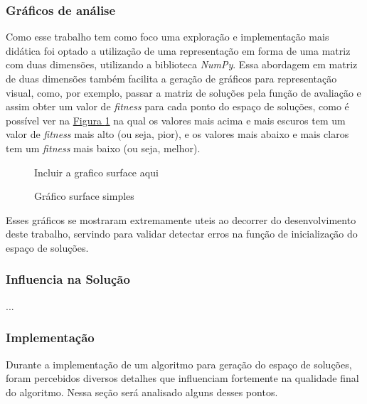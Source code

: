         \subsubsection{Gráficos de análise}
            Como esse trabalho tem como foco uma exploração e implementação mais didática foi optado a utilização de uma representação em forma de uma matriz com duas dimensões, utilizando a biblioteca \textit{NumPy}. Essa abordagem em matriz de duas dimensões também facilita a geração de gráficos para representação visual, como, por exemplo, passar a matriz de soluções pela função de avaliação e assim obter um valor de \textit{fitness} para cada ponto do espaço de soluções, como é possível ver na 
            \hyperref[fig:surfaceplot]{Figura \ref{fig:surfaceplot}} 
            na qual os valores mais acima e mais escuros tem um valor de \textit{fitness} mais alto (ou seja, pior), e os valores mais abaixo e mais claros tem um \textit{fitness} mais baixo (ou seja, melhor).\newline

            \begin{figure}[h]
                \centering
                \small{Incluir a grafico surface aqui}
                \caption{Gráfico surface simples}
                \label{fig:surfaceplot}
            \end{figure}

            Esses gráficos se mostraram extremamente uteis ao decorrer do desenvolvimento deste trabalho, servindo para validar detectar erros na função de inicialização do espaço de soluções.\newline


        \subsubsection{Influencia na Solução}
            ...
        

        \subsubsection{Implementação}
            Durante a implementação de um algoritmo para geração do espaço de soluções, foram percebidos diversos detalhes que influenciam fortemente na qualidade final do algoritmo. Nessa seção será analisado alguns desses pontos.

